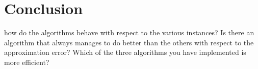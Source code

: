 \section{Conclusion}\label{conclusion}
 how do the algorithms behave with respect to the various instances? Is there an algorithm that always manages to do better than the others with respect to the approximation error? Which of the three algorithms you have implemented is more efficient?

\pagebreak